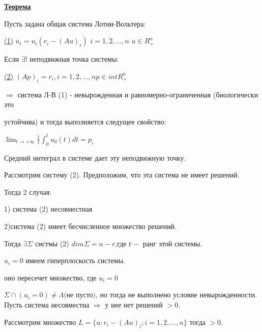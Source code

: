 \documentclass{article}
\begin{document}
\begin{large}
\vspace{0.5cm}
\textbf{\underline{Теорема}}

Пусть задана общая система Лотни-Вольтера:

\underline{(1)} $\dot{u_i} = u_i(r_i - (Au)_i)$ \hspace{0.2cm} $i = 1,2,...,n$ \hspace{0.2cm} $u \in R_+^n$
 
Если $\exists ! $ неподвижная точка системы:

\underline{(2)} $(Ap)_i = r_i, $\hspace{0.2cm}$ i = 1,2,...,n$\hspace{0.2cm}$ p \in intR_+^n$


$\Rightarrow$ система Л-В (1) - невырожденная и равномерно-ограниченная (биологически это

устойчива) и тогда выполняется следущее свойство:

\vspace{0.2cm}
\begin{center}
\begin{Large}
$
\lim_{t \to +\infty} \frac{1}{t}\int_0^t u_0(t)dt = p_i
$
\end{Large}

\end{center}
 
Средний интеграл в системе дает эту неподвижную точку.

\vspace{0.5cm}
Рассмотрим систему (2). Предположим, что эта система не имеет решений.

Тогда 2 случая:

\begin{center}
1) система (2) несовместная

2)система (2) имеет бесчисленное множество решений.
\end{center}

Тогда $\exists \Sigma$ систмы (2) $ dim \Sigma = n - r $,где  $г - $ ранг этой системы.

\vspace{0.5cm}
$u_i = 0$ имеем гиперплоскость системы.

оно пересечет множество, где $u_i = 0$

$
\Sigma\cap(u_i = 0) \neq\Lambda \textit{(не пусто)}
$, но тогда не выполнено условие невырожденности.
Пусть система несовместна $\Rightarrow$ у нее нет решений $>0$.

Рассмотрим множество $L = \lbrace u : r_i - (Au)_i; i = 1,2,...,n\rbrace$
тогда $>0$.


\end{large}
\end{document}
